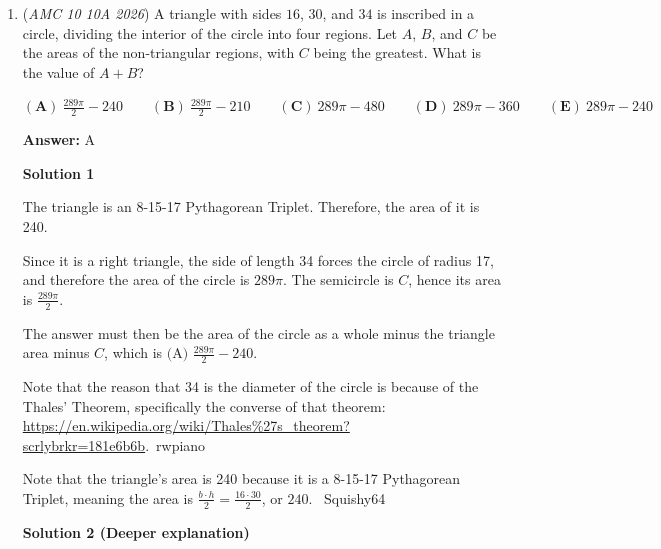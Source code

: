 \begin{enumerate}
 



\textbf{Solution 4}

The average of $94$ and $190$ is $142$. For values $a_3, a_4, \dots$ the mean won't change because the mean of the previous numbers is added, and adding a mean's value to a list leaves the mean unchanged. Therefore, the solution is $\boxed{142}$.

 Note: The previous n - 1 terms of the nth term just mean that you're performing the operation on all previous terms.

 


	\item (\textit{AMC 10 10A 2026}) A triangle with sides $16$, $30$, and $34$ is inscribed in a circle, dividing the interior of the circle into four regions. Let $A$, $B$, and $C$ be the areas of the non-triangular regions, with $C$ being the greatest. What is the value of $A+B$?


 $\mathbf{(A)}\ \frac{289\pi}{2}-240 \qquad \mathbf{(B)}\ \frac{289\pi}{2}-210 \qquad \mathbf{(C)}\ 289\pi-480 \qquad \mathbf{(D)}\ 289\pi-360 \qquad \mathbf{(E)}\ 289\pi- 240$

 \textbf{Answer: }A



\textbf{Solution 1}

The triangle is an 8-15-17 Pythagorean Triplet. Therefore, the area of it is 240.

 Since it is a right triangle, the side of length 34 forces the circle of radius 17, and therefore the area of the circle is $289 \pi$. The semicircle is $C$, hence its area is $\frac{289 \pi}{2}$.

 The answer must then be the area of the circle as a whole minus the triangle area minus $C$, which is $\boxed{\text{(A) }\frac{289 \pi}{2} - 240}$.

 Note that the reason that 34 is the diameter of the circle is because of the Thales' Theorem, specifically the converse of that theorem: \href{https://en.wikipedia.org/wiki/Thales\%27s\_theorem?scrlybrkr=181e6b6b}{https://en.wikipedia.org/wiki/Thales\%27s\_theorem?scrlybrkr=181e6b6b}.~rwpiano

 Note that the triangle's area is 240 because it is a 8-15-17 Pythagorean Triplet, meaning the area is $\frac{b \cdot h}{2} = \frac{16\cdot30}{2}$, or $240$. ~Squishy64

 



\textbf{Solution 2 (Deeper explanation)}


\end{enumerate}
